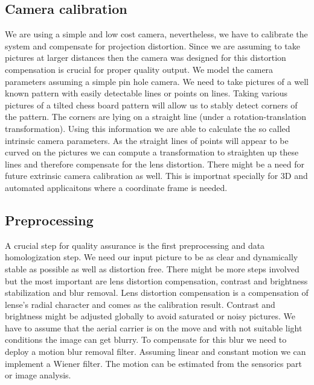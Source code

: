 \subsection{Camera calibration}
We are using a simple and low cost camera, nevertheless, we have to calibrate the system and compensate
for projection distortion. Since we are assuming to take pictures at larger distances then the camera was designed for
this distortion compensation is crucial for proper quality output. We model the camera parameters assuming a simple
pin hole camera. We need to take pictures of a well known pattern with easily detectable lines or points on lines. 
Taking various pictures of a tilted chess board pattern will allow us to stably detect corners of the pattern. The corners
are lying on a straight line (under a rotation-translation transformation). Using this information we are able to calculate
the so called intrinsic camera parameters. As the straight lines of points will appear to be curved on the pictures
we can compute a transformation to straighten up these lines and therefore compensate for the lens distortion. 
There might be a need for future extrinsic camera calibration as well. This is importnat specially for 3D and automated 
applicaitons where a coordinate frame is needed.

\subsection{Preprocessing}
\label{sec:preprocessing}
A crucial step for quality assurance is the first preprocessing and data homologization step. We need our
input picture to be as clear and dynamically stable as possible as well as distortion free. There might be 
more steps involved but the most important are lens distortion compensation, contrast and brightness stabilization 
and blur removal. Lens distortion compensation is a compensation of lense's radial character and comes
as the calibration result. Contrast and brightness might be adjusted globally to avoid saturated or
noisy pictures. We have to assume that the aerial carrier is on the move and with not suitable light
conditions the image can get blurry. To compensate for this blur we need to deploy a motion blur
removal filter. Assuming linear and constant motion we can implement a Wiener filter. The motion
can be estimated from the sensorics part or image analysis. 

